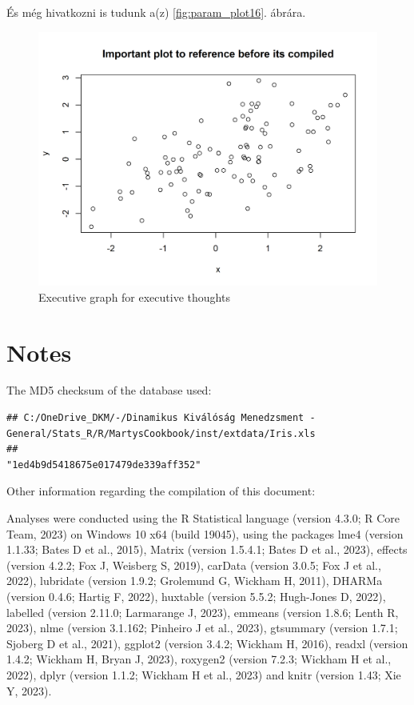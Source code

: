 \documentclass[]{elsarticle} %
\begin{document}
És még hivatkozni is tudunk a(z) \ref{fig:param_plot16}. ábrára.

\begin{figure}[H]

{\centering \includegraphics[width=0.9\linewidth]{cookbook_files/figure-latex/referenced_chunk-1} 

}

\caption{Executive graph for executive thoughts}\label{fig:referenced_chunk}
\end{figure}

\hypertarget{notes}{%
\section{Notes}\label{notes}}

The MD5 checksum of the database used:

\begin{verbatim}
## C:/OneDrive_DKM/-/Dinamikus Kiválóság Menedzsment - General/Stats_R/R/MartysCookbook/inst/extdata/Iris.xls 
##                                                                         "1ed4b9d5418675e017479de339aff352"
\end{verbatim}

Other information regarding the compilation of this document:

Analyses were conducted using the R Statistical language (version 4.3.0;
R Core Team, 2023) on Windows 10 x64 (build 19045), using the packages
lme4 (version 1.1.33; Bates D et al., 2015), Matrix (version 1.5.4.1;
Bates D et al., 2023), effects (version 4.2.2; Fox J, Weisberg S, 2019),
carData (version 3.0.5; Fox J et al., 2022), lubridate (version 1.9.2;
Grolemund G, Wickham H, 2011), DHARMa (version 0.4.6; Hartig F, 2022),
huxtable (version 5.5.2; Hugh-Jones D, 2022), labelled (version 2.11.0;
Larmarange J, 2023), emmeans (version 1.8.6; Lenth R, 2023), nlme
(version 3.1.162; Pinheiro J et al., 2023), gtsummary (version 1.7.1;
Sjoberg D et al., 2021), ggplot2 (version 3.4.2; Wickham H, 2016),
readxl (version 1.4.2; Wickham H, Bryan J, 2023), roxygen2 (version
7.2.3; Wickham H et al., 2022), dplyr (version 1.1.2; Wickham H et al.,
2023) and knitr (version 1.43; Xie Y, 2023).
\end{document}
